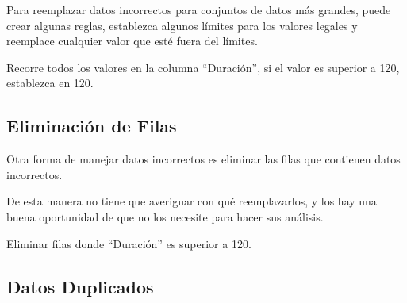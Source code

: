Para reemplazar datos incorrectos para conjuntos de datos más grandes,
puede crear algunas reglas, establezca algunos límites para los valores
legales y reemplace cualquier valor que esté fuera del límites.\\

\begin{code} Recorre todos los valores en la columna ``Duración'', si
el valor es superior a 120, establezca en 120.

\begin{Shaded}
\begin{Highlighting}[]
    \NormalTok{ df.loc[x, }\NormalTok{] }\OperatorTok{\textgreater{}} \NormalTok{:}
\NormalTok{        df.loc[x, }\NormalTok{] }\OperatorTok{=} 
\end{Highlighting}
\end{Shaded}
\end{code}

\subsection{Eliminación de Filas}

Otra forma de manejar datos incorrectos es eliminar las filas que
contienen datos incorrectos.

De esta manera no tiene que averiguar con qué reemplazarlos, y los hay
una buena oportunidad de que no los necesite para hacer sus análisis.\\

\begin{code} Eliminar filas donde ``Duración'' es superior a 120.

\begin{Shaded}
\begin{Highlighting}[]
    \NormalTok{ df.loc[x, }\NormalTok{] }\OperatorTok{\textgreater{}} \NormalTok{:}
\OperatorTok{=} \NormalTok{)}
\end{Highlighting}
\end{Shaded}
\end{code}

\subsection{Datos Duplicados}

